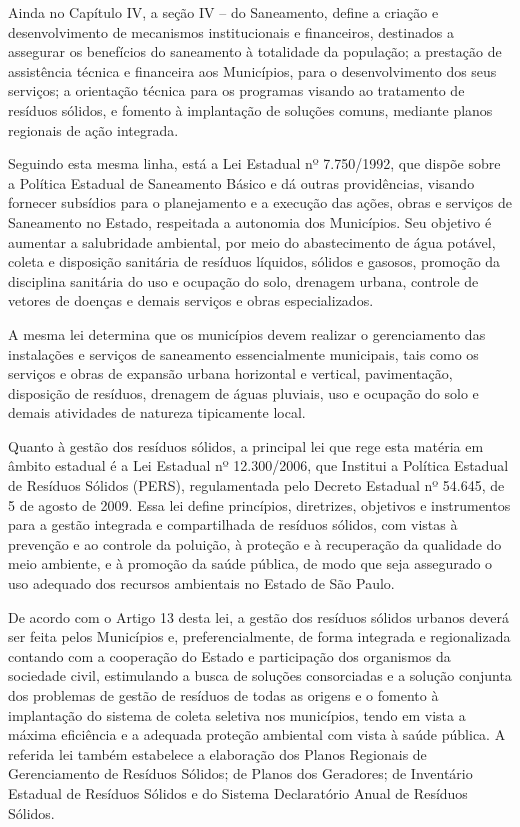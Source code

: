 	Ainda no Capítulo IV, a seção IV – do Saneamento, define a criação e desenvolvimento de mecanismos institucionais e financeiros, destinados a assegurar os benefícios do saneamento à totalidade da população; a prestação de assistência técnica e financeira aos Municípios, para o desenvolvimento dos seus serviços; a orientação técnica para os programas visando ao tratamento de resíduos sólidos, e fomento à implantação de soluções comuns, mediante planos regionais de ação integrada.
	
	Seguindo esta mesma linha, está a Lei Estadual nº 7.750/1992, que dispõe sobre a Política Estadual de Saneamento Básico e dá outras providências, visando fornecer subsídios para o planejamento e a execução das ações, obras e serviços de Saneamento no Estado, respeitada a autonomia dos Municípios. Seu objetivo é aumentar a salubridade ambiental, por meio do abastecimento de água potável, coleta e disposição sanitária de resíduos líquidos, sólidos e gasosos, promoção da disciplina sanitária do uso e ocupação do solo, drenagem urbana, controle de vetores de doenças e demais serviços e obras especializados.
	
	A mesma lei determina que os municípios devem realizar o gerenciamento das instalações e serviços de saneamento essencialmente municipais, tais como os serviços e obras de expansão urbana horizontal e vertical, pavimentação, disposição de resíduos, drenagem de águas pluviais, uso e ocupação do solo e demais atividades de natureza tipicamente local.
	
	Quanto à gestão dos resíduos sólidos, a principal lei que rege esta matéria em âmbito estadual é a Lei Estadual nº 12.300/2006,  que Institui a Política Estadual de Resíduos Sólidos (PERS), regulamentada pelo Decreto Estadual nº 54.645, de 5 de agosto de 2009. Essa lei define princípios, diretrizes, objetivos e instrumentos para a gestão integrada e compartilhada de resíduos sólidos, com vistas à prevenção e ao controle da poluição, à proteção e à recuperação da qualidade do meio ambiente, e à promoção da saúde pública, de modo que seja assegurado o uso adequado dos recursos ambientais no Estado de São Paulo.
	
	De acordo com o Artigo 13 desta lei, a gestão dos resíduos sólidos urbanos deverá ser feita pelos Municípios e, preferencialmente, de forma integrada e regionalizada contando com a cooperação do Estado e participação dos organismos da sociedade civil, estimulando a busca de soluções consorciadas e a solução conjunta dos problemas de gestão de resíduos de todas as origens e o fomento à implantação do sistema de coleta seletiva nos municípios, tendo em vista a máxima eficiência e a adequada proteção ambiental com vista à saúde pública. A referida lei também estabelece a elaboração dos Planos Regionais de Gerenciamento de Resíduos Sólidos; de Planos dos Geradores; de Inventário Estadual de Resíduos Sólidos e do Sistema Declaratório Anual de Resíduos Sólidos.
	
